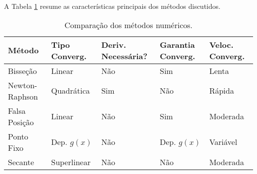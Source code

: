 A Tabela \ref{tab:comparacao} resume as características principais dos métodos
discutidos. \newline

\begin{table}[H]
	\centering
	\begin{longtable}{|p{1.97cm}|p{1.16cm}|p{1.3cm}|p{1.16cm}|p{1cm}|}
		\hline
		\textbf{} \newline \textbf{Método} & \textbf{Tipo} \newline \textbf{Converg.} & \textbf{Deriv.} \newline \textbf{Necessária?} & \textbf{Garantia} \newline \textbf{Converg.} & \textbf{Veloc.} \newline \textbf{Converg.} \\
		\hline
		\endfirsthead
		\hline
		\endfoot
		\hline
		Bisseção                           & Linear                                   & Não                                           & Sim                                          & Lenta                                      \\
		Newton-Raphson                     & Quadrática                               & Sim                                           & Não                                          & Rápida                                     \\
		Falsa Posição                      & Linear                                   & Não                                           & Sim                                          & Moderada                                   \\
		Ponto Fixo                         & Dep. \( g(x) \)                          & Não                                           & Dep. \( g(x) \)                              & Variável                                   \\
		Secante                            & Superlinear                              & Não                                           & Não                                          & Moderada                                   \\
		\hline
	\end{longtable}
	\caption{Comparação dos métodos numéricos.}
	\label{tab:comparacao}
\end{table}
